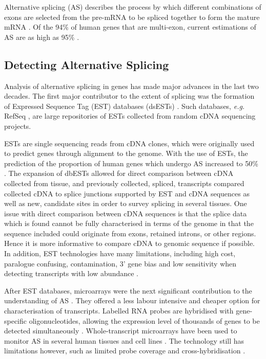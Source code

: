\documentclass[12pt]{article}
\begin{document}
		Alternative splicing (AS) describes the process by which different combinations of exons are selected from the pre-mRNA to be spliced together to form the mature mRNA \citep{Garcia-Blanco04}. 
		Of the 94\% of human genes that are multi-exon, current estimations of AS are as high as 95\% \citep{Pan08,Wang08}. 
			
		

		
		\subsection{Detecting Alternative Splicing}
		
				
			Analysis of alternative splicing in genes has made major advances in the last two decades.
			The first major contributor to the extent of splicing was the formation of Expressed Sequence Tag (EST) databases (dsESTs) \citep{Parkinson09}.
			Such databases, \textit{e.g.} RefSeq \citep{Pruitt14}, are large repositories of ESTs collected from random cDNA sequencing projects. %
			
			ESTs are single sequencing reads from cDNA clones, which were originally used to predict genes through alignment to the genome.
			With the use of ESTs, the prediction of the proportion of human genes which undergo AS increased to 50\% \citep{Kan01,Brett02}.
			The expansion of dbESTs allowed for direct comparison between cDNA collected from tissue, and previously collected, spliced, transcripts \citet{Pan08} compared collected cDNA to splice junctions supported by EST and cDNA sequences as well as new, candidate sites in order to survey splicing in several tissues.
			One issue with direct comparison between cDNA sequences is that the splice data which is found cannot be fully characterised in terms of the genome in that the sequence included could originate from exons, retained introns, or other regions. %
			Hence it is more informative to compare cDNA to genomic sequence if possible. 
			In addition, EST technologies have many limitations, including high cost, paralogue confusing, contamination, 3' gene bias and low sensitivity when detecting transcripts with low abundance \citep{Lewis03, Florea06, Wang10}.
			
			After EST databases, microarrays were the next significant contribution to the understanding of AS \citep{Johnson03}.
			They offered a less labour intensive and cheaper option for characterisation of transcripts.
			Labelled RNA probes are hybridised with gene-specific oligonucleotides, allowing the expression level of thousands of genes to be detected simultaneously \citep{Hu01, Wang03}. 
			Whole-transcript microarrays have been used to monitor AS in several human tissues and cell lines \citep{Castle08}.
			The technology still has limitations however, such as limited probe coverage and cross-hybridisation \citep{Wang10}. 
			
\end{document}
